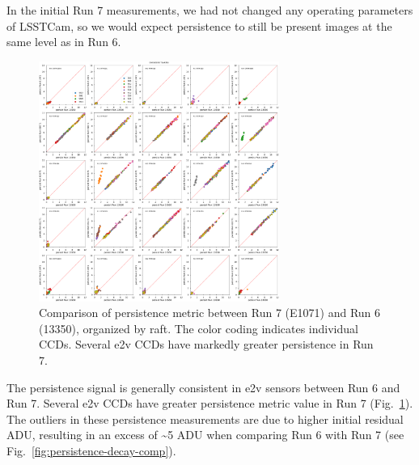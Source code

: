 In the initial Run 7 measurements, we had not changed any operating
parameters of LSSTCam, so we would expect persistence to still be
present images at the same level as in Run 6.

\begin{figure}[ht]
\begin{centering}
\includegraphics[width=0.7\textwidth]{figures/baselineCharacterization/13550_E1071_persist_inset.png}
\caption{Comparison of persistence metric between Run 7 (E1071) and Run 6 (13350), organized by raft.  The color coding indicates individual CCDs.  Several e2v CCDs have markedly greater persistence in Run 7.}
\label{fig:persistence-comp}
\end{centering}
\end{figure}

The persistence signal is generally consistent in e2v sensors between Run 6 and Run 7. Several e2v CCDs have greater persistence metric value in Run 7 (Fig.~\ref{fig:persistence-comp}). The outliers in
these persistence measurements are due to higher initial residual ADU, resulting in an excess of \textasciitilde5 ADU when comparing Run 6 with Run 7 (see Fig.~\ref{fig:persistence-decay-comp}).


